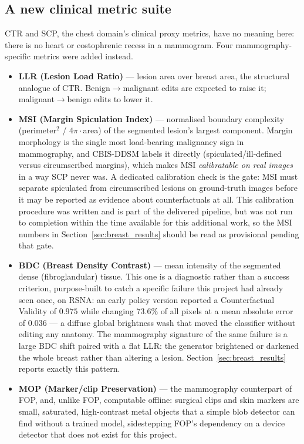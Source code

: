 \subsection{A new clinical metric suite}

CTR and SCP, the chest domain's clinical proxy metrics, have no meaning
here: there is no heart or costophrenic recess in a mammogram. Four
mammography-specific metrics were added instead.

\begin{itemize}[leftmargin=*]
  \item \textbf{LLR (Lesion Load Ratio)} --- lesion area over breast area,
        the structural analogue of CTR. Benign$\to$malignant edits are
        expected to raise it; malignant$\to$benign edits to lower it.
  \item \textbf{MSI (Margin Spiculation Index)} --- normalised boundary
        complexity (perimeter$^2$ / $4\pi\cdot$area) of the segmented
        lesion's largest component. Margin morphology is the single most
        load-bearing malignancy sign in mammography, and CBIS-DDSM labels it
        directly (spiculated/ill-defined versus circumscribed margins),
        which makes MSI \emph{calibratable on real images} in a way SCP
        never was. A dedicated calibration check is the gate: MSI must
        separate spiculated from circumscribed lesions on ground-truth
        images before it may be reported as evidence about counterfactuals
        at all. This calibration procedure was written and is part of the
        delivered pipeline, but was not run to completion within the time
        available for this additional work, so the MSI numbers in
        Section~\ref{sec:breast_results} should be read as provisional
        pending that gate.
  \item \textbf{BDC (Breast Density Contrast)} --- mean intensity of the
        segmented dense (fibroglandular) tissue. This one is a diagnostic
        rather than a success criterion, purpose-built to catch a specific
        failure this project had already seen once, on RSNA: an early
        policy version reported a Counterfactual Validity of $0.975$ while
        changing 73.6\% of all pixels at a mean absolute error of $0.036$
        --- a diffuse global brightness wash that moved the classifier
        without editing any anatomy. The mammography signature of the same
        failure is a large BDC shift paired with a flat LLR: the generator
        brightened or darkened the whole breast rather than altering a
        lesion. Section~\ref{sec:breast_results} reports exactly this
        pattern.
  \item \textbf{MOP (Marker/clip Preservation)} --- the mammography
        counterpart of FOP, and, unlike FOP, computable offline: surgical
        clips and skin markers are small, saturated, high-contrast metal
        objects that a simple blob detector can find without a trained
        model, sidestepping FOP's dependency on a device detector that does
        not exist for this project.
\end{itemize}

